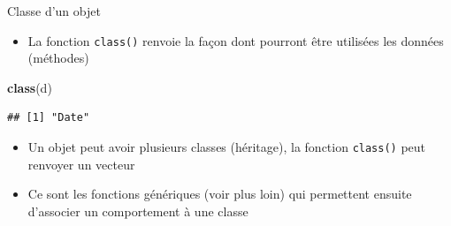 \documentclass[
  ignorenonframetext,
]{beamer}
\newenvironment{Shaded}{\begin{snugshade}}{\end{snugshade}}
\newcommand{\FunctionTok}[1]{\textcolor[rgb]{0.13,0.29,0.53}{\textbf{#1}}}
\newcommand{\NormalTok}[1]{#1}
\providecommand{\tightlist}{%
  \setlength{\itemsep}{0pt}\setlength{\parskip}{0pt}}
\begin{document}
\begin{frame}[fragile]{Classe d'un objet}
\protect\hypertarget{classe-dun-objet}{}
\begin{itemize}
\tightlist
\item
  La fonction \texttt{class()} renvoie la façon dont pourront être
  utilisées les données (méthodes)
\end{itemize}

\tiny

\begin{Shaded}
\begin{Highlighting}[]
\FunctionTok{class}\NormalTok{(d)}
\end{Highlighting}
\end{Shaded}

\begin{verbatim}
## [1] "Date"
\end{verbatim}

\normalsize

\begin{itemize}
\item
  Un objet peut avoir plusieurs classes (héritage), la fonction
  \texttt{class()} peut renvoyer un vecteur
\item
  Ce sont les fonctions génériques (voir plus loin) qui permettent
  ensuite d'associer un comportement à une classe
\end{itemize}
\end{frame}
\end{document}
